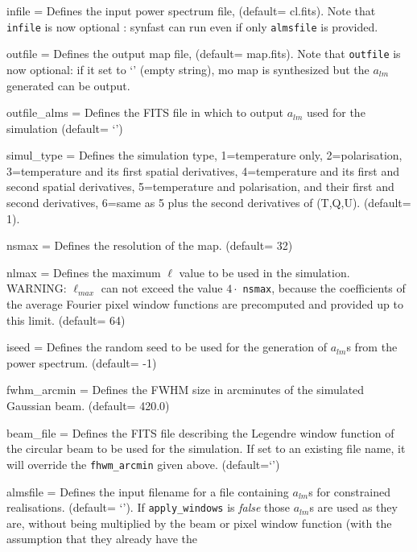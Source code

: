 \begin{qualifiers}
  \begin{qulistwide}{} %
    \item[{infile = }] Defines the input power spectrum file,
	(default= cl.fits). Note that {\tt infile} is now optional :
    synfast can run even if only {\tt almsfile} is provided.
    \item[{outfile = }] Defines the output map file,
(default= map.fits). Note that {\tt outfile} is now optional: if it set to 
      `' (empty string),  mo map is synthesized but the $a_{lm}$ generated can be output.
    \item[{outfile\_alms = }] Defines the FITS file in which to output $a_{lm}$ used
      for the simulation (default= `')
     \item[{simul\_type = }] Defines the simulation type, 1=temperature only,
       2=polarisation, 3=temperature and its first spatial derivatives,
       4=temperature and its first and second spatial derivatives, 5=temperature
       and polarisation, and their first and second derivatives, 6=same as 5
       plus the second derivatives of (T,Q,U).
(default= 1).
    \item[{nsmax = }] Defines the resolution of the map.
(default= 32)
     \item[{nlmax = }] Defines the maximum $\ell$ value 
to be used in the simulation. WARNING: $\ell_{max}$ can not exceed
the value $4\cdot$ {\tt nsmax}, because the coefficients of the  average Fourier 
pixel window functions
are precomputed and provided up to this limit.
(default= 64)
      \item[{iseed = }] Defines the random seed to be used 
for the generation of $a_{lm}$s from the power spectrum.
(default= -1)
    \item[{fwhm\_arcmin = }] Defines the FWHM size in arcminutes 
of the simulated Gaussian beam.
(default= 420.0)
%
    \item[{beam\_file = }] Defines the FITS file describing the
    Legendre window
    function of the circular beam to be used for the
    simulation. If set to an existing file name, it will override the
    {\tt fhwm\_arcmin} given above. (default=`')
%
     \item[{almsfile = }] Defines the input filename for a file
    containing $a_{lm}$s for constrained realisations. 
(default= `'). If {\tt apply\_windows} is {\em false} 
those $a_{lm}$s are used as they are, without being multiplied
by the beam or pixel window function (with the assumption that they already have the

\end{qulistwide}
\end{qualifiers}
